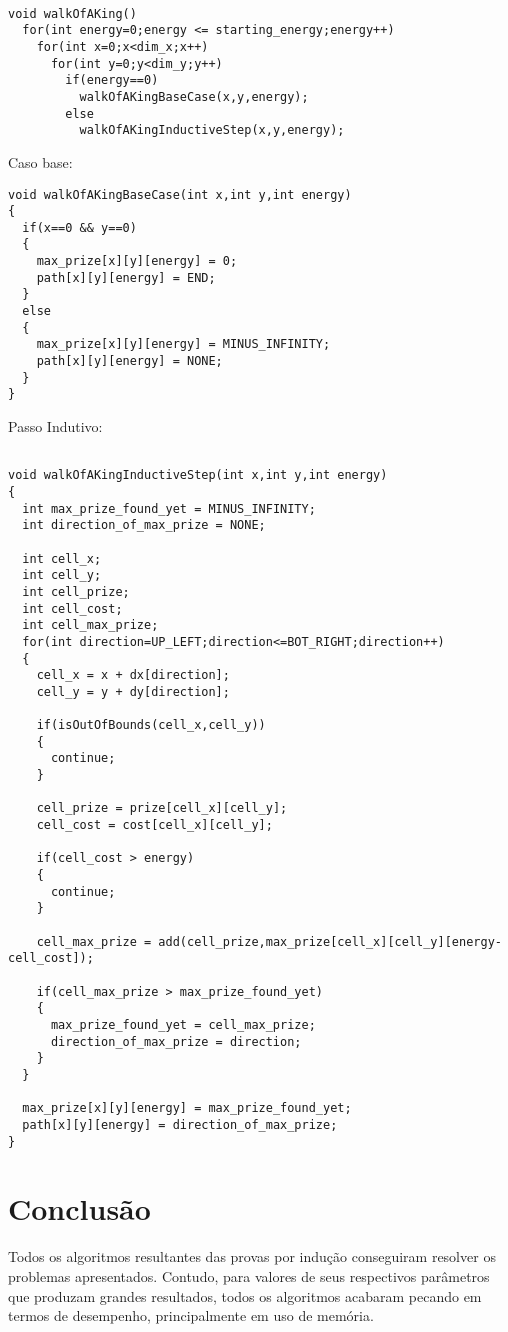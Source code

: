 \documentclass[12pt]{article}
\begin{document}
\begin{lstlisting}

void walkOfAKing()
  for(int energy=0;energy <= starting_energy;energy++)
    for(int x=0;x<dim_x;x++)
      for(int y=0;y<dim_y;y++)
        if(energy==0)
          walkOfAKingBaseCase(x,y,energy);
        else
          walkOfAKingInductiveStep(x,y,energy);
\end{lstlisting}
Caso base:
\begin{lstlisting}
void walkOfAKingBaseCase(int x,int y,int energy)
{
  if(x==0 && y==0)
  {
    max_prize[x][y][energy] = 0;
    path[x][y][energy] = END;
  }
  else
  {
    max_prize[x][y][energy] = MINUS_INFINITY;
    path[x][y][energy] = NONE;  
  } 
}
\end{lstlisting}
Passo Indutivo:
\begin{lstlisting}

void walkOfAKingInductiveStep(int x,int y,int energy)
{
  int max_prize_found_yet = MINUS_INFINITY;
  int direction_of_max_prize = NONE;

  int cell_x;
  int cell_y;
  int cell_prize;
  int cell_cost;
  int cell_max_prize;
  for(int direction=UP_LEFT;direction<=BOT_RIGHT;direction++)
  {
    cell_x = x + dx[direction];
    cell_y = y + dy[direction];

    if(isOutOfBounds(cell_x,cell_y))
    {
      continue;
    }

    cell_prize = prize[cell_x][cell_y];
    cell_cost = cost[cell_x][cell_y];

    if(cell_cost > energy)
    {
      continue;
    }

    cell_max_prize = add(cell_prize,max_prize[cell_x][cell_y][energy-cell_cost]);

    if(cell_max_prize > max_prize_found_yet)
    {
      max_prize_found_yet = cell_max_prize;
      direction_of_max_prize = direction;
    }
  }

  max_prize[x][y][energy] = max_prize_found_yet;
  path[x][y][energy] = direction_of_max_prize;
}
\end{lstlisting}



\newpage
\section{Conclusão}
\indent Todos os algoritmos resultantes das provas por indução conseguiram resolver os problemas apresentados. Contudo, para valores de seus respectivos parâmetros que produzam grandes resultados, todos os algoritmos acabaram pecando em termos de desempenho, principalmente em uso de memória.\\
\end{document}
